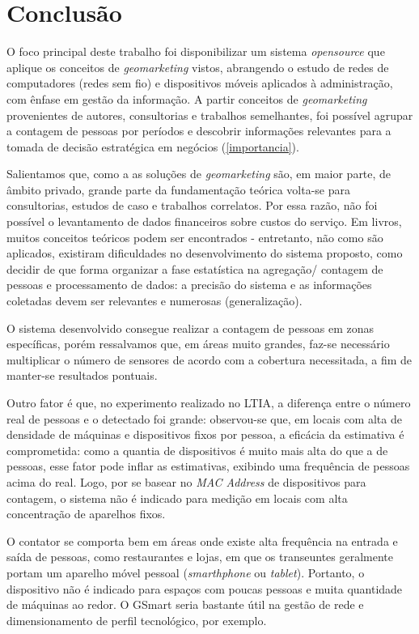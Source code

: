 \chapter{Conclusão}
\label{conclusao}

O foco principal deste trabalho foi disponibilizar um sistema \emph{opensource}
que aplique os conceitos de \emph{geomarketing} vistos, abrangendo o estudo de
redes de computadores (redes sem fio) e dispositivos móveis aplicados à
administração, com ênfase em gestão da informação. A partir conceitos de
\emph{geomarketing} provenientes de autores, consultorias e trabalhos
semelhantes, foi possível agrupar a contagem de pessoas por períodos e descobrir
informações relevantes para a tomada de decisão estratégica em negócios
(\autoref{importancia}).

Salientamos que, como a as soluções de \emph{geomarketing}
são, em maior parte, de âmbito privado, grande parte da fundamentação teórica
volta-se para consultorias, estudos de caso e trabalhos correlatos. Por essa
razão, não foi possível o levantamento de dados financeiros sobre custos do serviço. Em livros, muitos conceitos teóricos podem ser encontrados -
entretanto, não como são aplicados, existiram dificuldades no desenvolvimento do
sistema proposto, como decidir de que forma organizar a fase estatística na
agregação/ contagem de pessoas e processamento de dados: a precisão do sistema e
as informações coletadas devem ser relevantes e numerosas (generalização).

O sistema desenvolvido consegue realizar a contagem de pessoas em zonas
específicas, porém ressalvamos que, em áreas muito grandes, faz-se necessário
multiplicar o número de sensores de acordo com a cobertura necessitada, a fim de
manter-se resultados pontuais.

Outro fator é que, no experimento realizado no LTIA, a diferença entre o número
real de pessoas e o detectado foi grande:  observou-se que, em locais com alta
de densidade de máquinas e dispositivos fixos por pessoa, a eficácia da
estimativa é comprometida: como a quantia de dispositivos é muito mais alta do
que a de pessoas, esse fator pode inflar as estimativas, exibindo uma frequência
de pessoas acima do real. Logo, por se basear no \emph{MAC Address} de
dispositivos para contagem, o sistema não é indicado para medição em locais com
alta concentração de aparelhos fixos.

O contator se comporta bem em áreas onde existe alta frequência na entrada e saída de pessoas, como
restaurantes e lojas, em que os transeuntes geralmente portam um aparelho móvel
pessoal (\emph{smarthphone} ou \emph{tablet}). Portanto, o dispositivo não é indicado para espaços com poucas pessoas e muita quantidade de máquinas ao redor. O GSmart seria bastante útil na gestão de rede e dimensionamento de perfil tecnológico, por exemplo.

